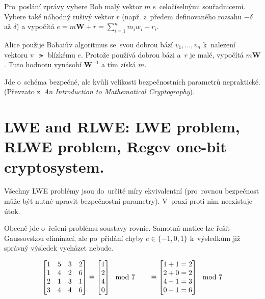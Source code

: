 Pro~poslání zprávy vybere Bob malý vektor $m$ s~celočíselnými souřadnicemi.
Vybere také náhodný rušivý vektor $r$ (např. z~předem definovaného rozsahu $-\delta$ až $\delta$) a vypočítá
$e = m\textbf{W} + r = \sum_{i=1}^n m_i w_i + r_i$.

Alice použije Babaiův algoritmus se~svou dobrou bází $v_1, \dots, v_n$ k~nalezení vektoru v~$\lat$ blízkému $e$.
Protože používá dobrou bázi a~$r$ je malé, vypočítá $m\textbf{W}$.
Tuto hodnotu vynásobí $\textbf{W}^{-1}$ a tím získá $m$.

Jde o~schéma bezpečné, ale kvůli velikosti bezpečnostních parametrů nepraktické.
(Převzato z~\emph{An Introduction to Mathematical Cryptography}\footnotemark{}).


\clearpage
\section{LWE and RLWE: LWE problem, RLWE problem, Regev one-bit cryptosystem.}

Všechny LWE problémy jsou do~určité míry ekvivalentní (pro~rovnou bezpečnost může být nutné upravit bezpečnostní parametry).
V~praxi proti nim neexistuje útok.

Obecně jde o~řešení problému soustavy rovnic.
Samotná matice lze řešit Gaussovskou eliminací, ale po~přidání chyby $e \in \{-1, 0, 1\}$ k~výsledkům již správný výsledek vycházet nebude.

$$
\left[
\begin{matrix}
1 & 5 & 3 & 2 \\
1 & 4 & 2 & 6 \\
2 & 1 & 3 & 1 \\
3 & 4 & 4 & 6 \\
\end{matrix}
\right] \equiv \left[
\begin{matrix}
1 \\ 2 \\ 4 \\ 0
\end{matrix}
\right] \mod 7
\hspace*{2em}
\equiv \left[
\begin{matrix}
1+1=2 \\ 2+0=2 \\ 4-1=3 \\ 0-1=6 \\
\end{matrix}
\right] \mod 7
$$


